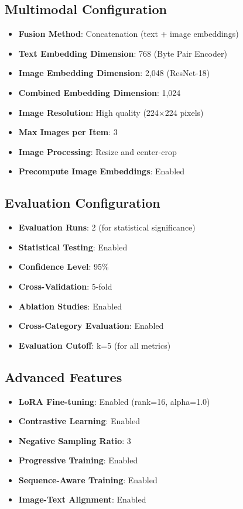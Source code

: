 \documentclass[conference]{IEEEtran}
\begin{document}
\subsection*{Multimodal Configuration}
\begin{itemize}
    \item \textbf{Fusion Method}: Concatenation (text + image embeddings)
    \item \textbf{Text Embedding Dimension}: 768 (Byte Pair Encoder)
    \item \textbf{Image Embedding Dimension}: 2,048 (ResNet-18)
    \item \textbf{Combined Embedding Dimension}: 1,024
    \item \textbf{Image Resolution}: High quality (224×224 pixels)
    \item \textbf{Max Images per Item}: 3
    \item \textbf{Image Processing}: Resize and center-crop
    \item \textbf{Precompute Image Embeddings}: Enabled
\end{itemize}

\subsection*{Evaluation Configuration}
\begin{itemize}
    \item \textbf{Evaluation Runs}: 2 (for statistical significance)
    \item \textbf{Statistical Testing}: Enabled
    \item \textbf{Confidence Level}: 95\%
    \item \textbf{Cross-Validation}: 5-fold
    \item \textbf{Ablation Studies}: Enabled
    \item \textbf{Cross-Category Evaluation}: Enabled
    \item \textbf{Evaluation Cutoff}: k=5 (for all metrics)
\end{itemize}

\subsection*{Advanced Features}
\begin{itemize}
    \item \textbf{LoRA Fine-tuning}: Enabled (rank=16, alpha=1.0)
    \item \textbf{Contrastive Learning}: Enabled
    \item \textbf{Negative Sampling Ratio}: 3
    \item \textbf{Progressive Training}: Enabled
    \item \textbf{Sequence-Aware Training}: Enabled
    \item \textbf{Image-Text Alignment}: Enabled
\end{itemize}
\end{document}
